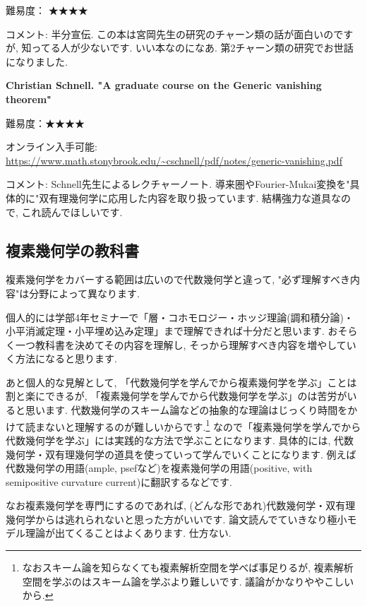 難易度： ★★★★\vspace{-6pt} 

コメント: 半分宣伝. この本は宮岡先生の研究のチャーン類の話が面白いのですが, 知ってる人が少ないです. いい本なのになあ. 第2チャーン類の研究でお世話になりました. 

\textbf{Christian Schnell. "A graduate course on the Generic vanishing theorem" }  \vspace{-6pt} 

難易度：★★★★\vspace{-6pt} 

オンライン入手可能: \url{https://www.math.stonybrook.edu/~cschnell/pdf/notes/generic-vanishing.pdf} \vspace{-6pt} 

コメント: Schnell先生によるレクチャーノート. 導来圏やFourier-Mukai変換を"具体的に"双有理幾何学に応用した内容を取り扱っています. 結構強力な道具なので, これ読んでほしいです. 
\vspace{8pt}

\subsection{複素幾何学の教科書}
複素幾何学をカバーする範囲は広いので代数幾何学と違って, "必ず理解すべき内容"は分野によって異なります.  

個人的には学部4年セミナーで「層・コホモロジー・ホッジ理論(調和積分論)・小平消滅定理・小平埋め込み定理」まで理解できれば十分だと思います. 
おそらく一つ教科書を決めてその内容を理解し, そっから理解すべき内容を増やしていく方法になると思ります. 

あと個人的な見解として, 「代数幾何学を学んでから複素幾何学を学ぶ」ことは割と楽にできるが, 「複素幾何学を学んでから代数幾何学を学ぶ」のは苦労がいると思います. 代数幾何学のスキーム論などの抽象的な理論はじっくり時間をかけて読まないと理解するのが難しいからです.\footnote{なおスキーム論を知らなくても複素解析空間を学べば事足りるが, 複素解析空間を学ぶのはスキーム論を学ぶより難しいです. 議論がかなりややこしいから. } 
なので「複素幾何学を学んでから代数幾何学を学ぶ」には実践的な方法で学ぶことになります. 
具体的には, 代数幾何学・双有理幾何学の道具を使っていって学んでいくことになります. 
例えば代数幾何学の用語(ample, psefなど)を複素幾何学の用語(positive, with semipositive curvature current)に翻訳するなどです. 

なお複素幾何学を専門にするのであれば, (どんな形であれ)代数幾何学・双有理幾何学からは逃れられないと思った方がいいです. 論文読んでていきなり極小モデル理論が出てくることはよくあります. 仕方ない.  

